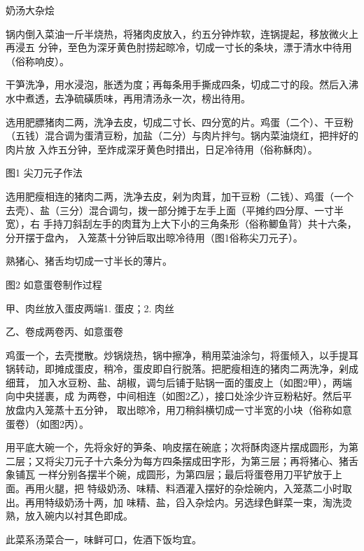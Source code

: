 \begin{recipe}{奶汤大杂烩}

\ingredients


\cooking

\step
锅内倒入菜油一斤半烧热，将猪肉皮放入，约五分钟炸软，连锅提起，移放微火上再浸五
分钟，至色为深牙黄色肘捞起晾冷，切成一寸长的条块，漂于清水中待用（俗称响皮）。

\step 干笋洗净，用水浸泡，胀透为度；再每条用手撕成四条，切成二寸的段。然后入沸
水中煮透，去净硫磺质味，再用清汤永一次，榜出待用。

\step 选用肥膘猪肉二两，洗净去皮，切成二寸长、四分宽的片。鸡蛋（二个）、干豆粉
（五钱）混合调为蛋清豆粉，加盐（二分）与肉片拌勻。锅内菜油烧红，把拌好的肉片放
入炸五分钟，至炸成深牙黄色时措出，日足冷待用（俗称穌肉）。

图1 尖刀元子作法

\step 选用肥瘦相连的猪肉二两，洗净去皮，剁为肉茸，加干豆粉（二钱）、鸡蛋（一个
去壳）、盐（三分）混合调匀，拨一部分摊于左手上面（平摊约四分厚、一寸半宽），右
手持刀斜刮左手的肉茸为上大下小的三角条形（俗称鲫鱼背）共十六条，分开摆于盘內，
入笼蒸十分钟后取出晾冷待用（图1俗称尖刀元子）。

\step 熟猪心、猪舌均切成一寸半长的薄片。

图2 如意蛋卷制作过程

甲、肉丝放入蛋皮两端1. 蛋皮；2. 肉丝

乙、卷成两卷丙、如意蛋卷

\step 鸡蛋一个，去壳搅散。炒锅烧热，锅中擦净，稍用菜油涂匀，将蛋倾入，以手提耳
锅转动，即摊成蛋皮，稍冷，蛋皮即自行脱落。把肥瘦相连的猪肉二两洗净，剁成细茸，
加入水豆粉、盐、胡椒，调匀后铺于贴锅一面的蛋皮上（如图2甲），两端向中央搓裹，成
为两卷，中间相连（如图2乙），接口处涂少许豆粉粘好。然后平放盘内入笼蒸十五分钟，
取出晾冷，用刀稍斜横切成一寸半宽的小块（俗称如意蛋卷）（如图2丙）。

\step 用平底大碗一个，先将汆好的笋条、响皮摆在碗底；次将酥肉逐片摆成圆形，为第
二层；又将尖刀元子十六条分为每方四条摆成田字形，为第三层；再将猪心、猪舌象铺瓦
一样分别各摆半个碗，成圆形，为第四层；最后将蛋卷用刀平铲放于上面。再用火腿，把
特级奶汤、味精、料酒灌入摆好的杂烩碗内，入笼蒸二小时取出。再用特级奶汤十两，加
味精、盐，舀入杂烩内。另选绿色鲜菜一束，淘洗烫熟，放入碗内以衬其色即成。

\notes

此菜系汤菜合一，味鲜可口，佐酒下饭均宜。

\end{recipe}

